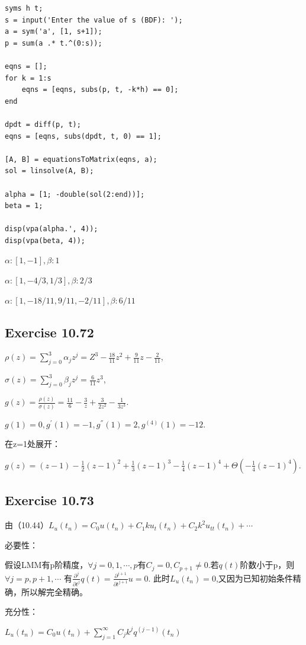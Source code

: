 \documentclass[UTF8]{ctexart}
\begin{document}
\begin{lstlisting}
syms h t;
s = input('Enter the value of s (BDF): ');
a = sym('a', [1, s+1]);
p = sum(a .* t.^(0:s));

eqns = [];
for k = 1:s
    eqns = [eqns, subs(p, t, -k*h) == 0];
end

dpdt = diff(p, t);
eqns = [eqns, subs(dpdt, t, 0) == 1]; 

[A, B] = equationsToMatrix(eqns, a);
sol = linsolve(A, B);

alpha = [1; -double(sol(2:end))];
beta = 1; 

disp(vpa(alpha.', 4));
disp(vpa(beta, 4));
\end{lstlisting}

$\alpha: [1, -1], \beta: 1$

$\alpha: [1, -4/3, 1/3], \beta: 2/3$

$\alpha: [1, -18/11, 9/11, -2/11], \beta: 6/11$


\subsection*{Exercise 10.72}
$\rho(z) = \sum_{j = 0}^{3} \alpha_j z^j = Z^3 -\frac{18}{11}z^2 + \frac{9}{11}z - \frac{2}{11}$,

$\sigma (z) = \sum_{j = 0}^{3} \beta_j z^j = \frac{6}{11}z^3$,

$g(z) = \frac{\rho(z)}{\sigma(z)} = \frac{11}{6} - \frac{3}{z} + \frac{3}{2z^2} - \frac{1}{3z^3}$.

$g(1) = 0, g^{'}(1) = -1, g^{''}(1) = 2, g^{(4)}(1) = -12$.

在z=1处展开：

$g(z) = (z-1) - \frac{1}{2}(z-1)^2 + \frac{1}{3}(z-1)^3 -\frac{1}{4}(z-1)^4 + \varTheta (-\frac{1}{4}(z-1)^4)$.


\subsection*{Exercise 10.73}
由（10.44）$L_u(t_n) = C_0u(t_n) + C_1ku_t(t_n) + C_2k^2u_{tt}(t_n) + \cdots$

必要性：

假设LMM有p阶精度，$\forall j = 0,1,\cdots,p$有$C_j = 0, C_{p+1} \neq 0$.若$q(t)$阶数小于p，则$\forall j = p, p+1, \cdots$
有$\frac{\partial^j}{\partial t^j}q(t) = \frac{\partial^{j+1}}{\partial t^{j+1}}u = 0$.
此时$L_u(t_n) = 0$,又因为已知初始条件精确，所以解完全精确。

充分性：

$L_u(t_n) = C_0u(t_n) + \sum_{j = 1}^{\infty} C_jk^jq^{(j-1)}(t_n)$
\end{document}
